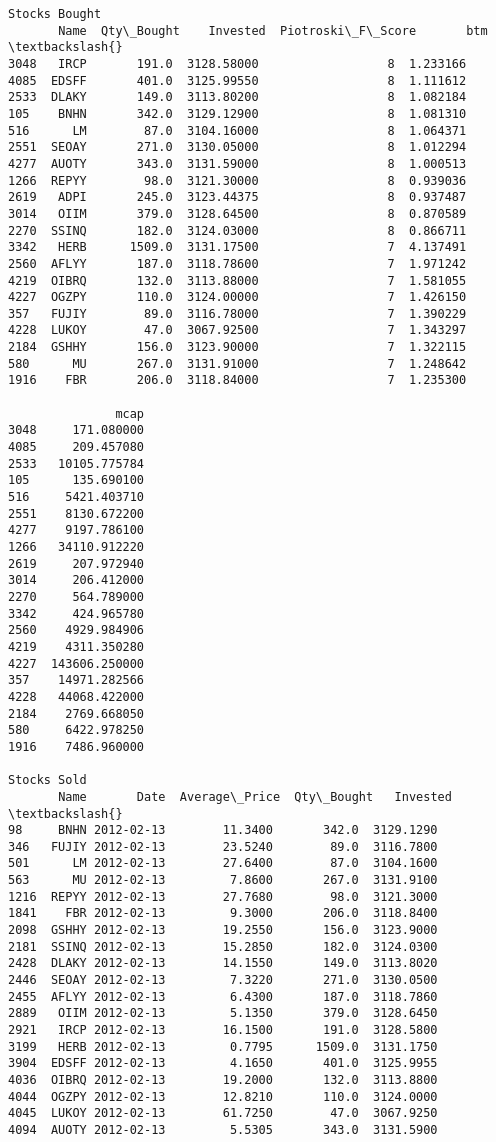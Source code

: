 \documentclass[11pt]{article}
\begin{document}
\begin{Verbatim}[commandchars=\\\{\}]
Stocks Bought
       Name  Qty\_Bought    Invested  Piotroski\_F\_Score       btm  \textbackslash{}
3048   IRCP       191.0  3128.58000                  8  1.233166
4085  EDSFF       401.0  3125.99550                  8  1.111612
2533  DLAKY       149.0  3113.80200                  8  1.082184
105    BNHN       342.0  3129.12900                  8  1.081310
516      LM        87.0  3104.16000                  8  1.064371
2551  SEOAY       271.0  3130.05000                  8  1.012294
4277  AUOTY       343.0  3131.59000                  8  1.000513
1266  REPYY        98.0  3121.30000                  8  0.939036
2619   ADPI       245.0  3123.44375                  8  0.937487
3014   OIIM       379.0  3128.64500                  8  0.870589
2270  SSINQ       182.0  3124.03000                  8  0.866711
3342   HERB      1509.0  3131.17500                  7  4.137491
2560  AFLYY       187.0  3118.78600                  7  1.971242
4219  OIBRQ       132.0  3113.88000                  7  1.581055
4227  OGZPY       110.0  3124.00000                  7  1.426150
357   FUJIY        89.0  3116.78000                  7  1.390229
4228  LUKOY        47.0  3067.92500                  7  1.343297
2184  GSHHY       156.0  3123.90000                  7  1.322115
580      MU       267.0  3131.91000                  7  1.248642
1916    FBR       206.0  3118.84000                  7  1.235300

               mcap
3048     171.080000
4085     209.457080
2533   10105.775784
105      135.690100
516     5421.403710
2551    8130.672200
4277    9197.786100
1266   34110.912220
2619     207.972940
3014     206.412000
2270     564.789000
3342     424.965780
2560    4929.984906
4219    4311.350280
4227  143606.250000
357    14971.282566
4228   44068.422000
2184    2769.668050
580     6422.978250
1916    7486.960000

Stocks Sold
       Name       Date  Average\_Price  Qty\_Bought   Invested  \textbackslash{}
98     BNHN 2012-02-13        11.3400       342.0  3129.1290
346   FUJIY 2012-02-13        23.5240        89.0  3116.7800
501      LM 2012-02-13        27.6400        87.0  3104.1600
563      MU 2012-02-13         7.8600       267.0  3131.9100
1216  REPYY 2012-02-13        27.7680        98.0  3121.3000
1841    FBR 2012-02-13         9.3000       206.0  3118.8400
2098  GSHHY 2012-02-13        19.2550       156.0  3123.9000
2181  SSINQ 2012-02-13        15.2850       182.0  3124.0300
2428  DLAKY 2012-02-13        14.1550       149.0  3113.8020
2446  SEOAY 2012-02-13         7.3220       271.0  3130.0500
2455  AFLYY 2012-02-13         6.4300       187.0  3118.7860
2889   OIIM 2012-02-13         5.1350       379.0  3128.6450
2921   IRCP 2012-02-13        16.1500       191.0  3128.5800
3199   HERB 2012-02-13         0.7795      1509.0  3131.1750
3904  EDSFF 2012-02-13         4.1650       401.0  3125.9955
4036  OIBRQ 2012-02-13        19.2000       132.0  3113.8800
4044  OGZPY 2012-02-13        12.8210       110.0  3124.0000
4045  LUKOY 2012-02-13        61.7250        47.0  3067.9250
4094  AUOTY 2012-02-13         5.5305       343.0  3131.5900


\end{Verbatim}
\end{document}

